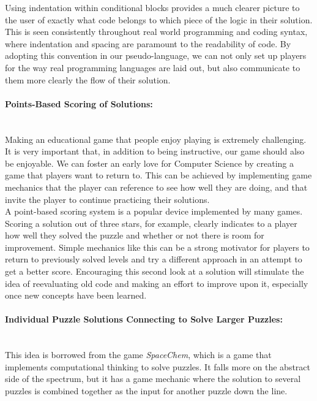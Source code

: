 Using indentation within conditional blocks provides a much clearer picture to the user of exactly what code belongs
to which piece of the logic in their solution. This is seen consistently throughout real world programming and coding
syntax, where indentation and spacing are paramount to the readability of code. By adopting this convention
in our pseudo-language, we can not only set up players for the way real programming languages are laid out, but
also communicate to them more clearly the flow of their solution.\\

\paragraph{Points-Based Scoring of Solutions:} ~\\
Making an educational game that people enjoy playing is extremely challenging. It is very important that, in addition
to being instructive, our game should also be enjoyable. We can foster an early love for Computer Science by
creating a game that players want to return to. This can be achieved by implementing game mechanics that the
player can reference to see how well they are doing, and that invite the player to continue practicing their solutions.\\

A point-based scoring system is a popular device implemented by many games. Scoring a solution out of three stars,
for example, clearly indicates to a player how well they solved the puzzle and whether or not there is room for
improvement. Simple mechanics like this can be a strong motivator for players to return to previously solved levels
and try a different approach in an attempt to get a better score. Encouraging this second look at a solution will
stimulate the idea of reevaluating old code and making an effort to improve upon it, especially once new concepts
have been learned.\\

\paragraph{Individual Puzzle Solutions Connecting to Solve Larger Puzzles:} ~\\
This idea is borrowed from the game \textit{SpaceChem}, which is a game that implements computational thinking
to solve puzzles. It falls more on the abstract side of the spectrum, but it has a game mechanic where the solution to
several puzzles is combined together as the input for another puzzle down the line.\\

